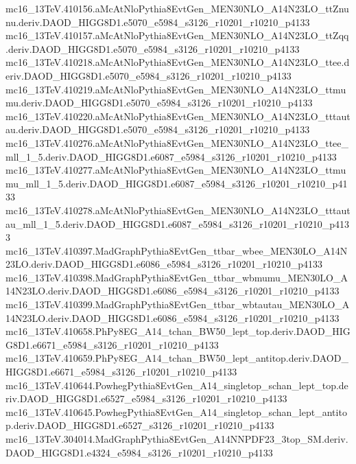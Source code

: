 mc16_13TeV.410156.aMcAtNloPythia8EvtGen_MEN30NLO_A14N23LO_ttZnunu.deriv.DAOD_HIGG8D1.e5070_e5984_s3126_r10201_r10210_p4133 \\
mc16_13TeV.410157.aMcAtNloPythia8EvtGen_MEN30NLO_A14N23LO_ttZqq.deriv.DAOD_HIGG8D1.e5070_e5984_s3126_r10201_r10210_p4133 \\
mc16_13TeV.410218.aMcAtNloPythia8EvtGen_MEN30NLO_A14N23LO_ttee.deriv.DAOD_HIGG8D1.e5070_e5984_s3126_r10201_r10210_p4133 \\
mc16_13TeV.410219.aMcAtNloPythia8EvtGen_MEN30NLO_A14N23LO_ttmumu.deriv.DAOD_HIGG8D1.e5070_e5984_s3126_r10201_r10210_p4133 \\
mc16_13TeV.410220.aMcAtNloPythia8EvtGen_MEN30NLO_A14N23LO_tttautau.deriv.DAOD_HIGG8D1.e5070_e5984_s3126_r10201_r10210_p4133 \\
mc16_13TeV.410276.aMcAtNloPythia8EvtGen_MEN30NLO_A14N23LO_ttee_mll_1_5.deriv.DAOD_HIGG8D1.e6087_e5984_s3126_r10201_r10210_p4133 \\
mc16_13TeV.410277.aMcAtNloPythia8EvtGen_MEN30NLO_A14N23LO_ttmumu_mll_1_5.deriv.DAOD_HIGG8D1.e6087_e5984_s3126_r10201_r10210_p4133 \\
mc16_13TeV.410278.aMcAtNloPythia8EvtGen_MEN30NLO_A14N23LO_tttautau_mll_1_5.deriv.DAOD_HIGG8D1.e6087_e5984_s3126_r10201_r10210_p4133 \\
mc16_13TeV.410397.MadGraphPythia8EvtGen_ttbar_wbee_MEN30LO_A14N23LO.deriv.DAOD_HIGG8D1.e6086_e5984_s3126_r10201_r10210_p4133 \\
mc16_13TeV.410398.MadGraphPythia8EvtGen_ttbar_wbmumu_MEN30LO_A14N23LO.deriv.DAOD_HIGG8D1.e6086_e5984_s3126_r10201_r10210_p4133 \\
mc16_13TeV.410399.MadGraphPythia8EvtGen_ttbar_wbtautau_MEN30LO_A14N23LO.deriv.DAOD_HIGG8D1.e6086_e5984_s3126_r10201_r10210_p4133 \\
mc16_13TeV.410658.PhPy8EG_A14_tchan_BW50_lept_top.deriv.DAOD_HIGG8D1.e6671_e5984_s3126_r10201_r10210_p4133 \\
mc16_13TeV.410659.PhPy8EG_A14_tchan_BW50_lept_antitop.deriv.DAOD_HIGG8D1.e6671_e5984_s3126_r10201_r10210_p4133 \\
mc16_13TeV.410644.PowhegPythia8EvtGen_A14_singletop_schan_lept_top.deriv.DAOD_HIGG8D1.e6527_e5984_s3126_r10201_r10210_p4133 \\
mc16_13TeV.410645.PowhegPythia8EvtGen_A14_singletop_schan_lept_antitop.deriv.DAOD_HIGG8D1.e6527_s3126_r10201_r10210_p4133 \\
mc16_13TeV.304014.MadGraphPythia8EvtGen_A14NNPDF23_3top_SM.deriv.DAOD_HIGG8D1.e4324_e5984_s3126_r10201_r10210_p4133 \\
